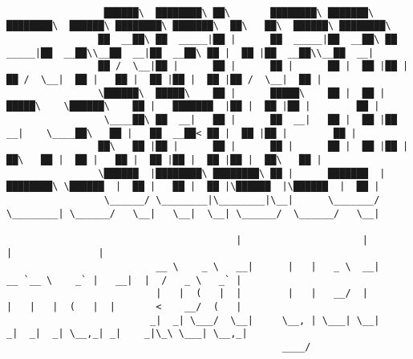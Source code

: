 \documentclass[varwidth=\maxdimen,margin=0.5cm,multi={verbatim}]{standalone}
\begin{document}
\begin{verbatim}

                 ██████\  ████████\ ██\       ████████\ ███████\  ████████\  ██████\ ████████\ ███████\  ██\   ██\  ██████\ ████████\ 
                ██  __██\ ██  _____|██ |      ██  _____|██  __██\ ██  _____|██  __██\\__██  __|██  __██\ ██ |  ██ |██  __██\\__██  __|
                ██ /  \__|██ |      ██ |      ██ |      ██ |  ██ |██ |      ██ /  \__|  ██ |   ██ |  ██ |██ |  ██ |██ /  \__|  ██ |   
                \██████\  █████\    ██ |      █████\    ██ |  ██ |█████\    \██████\    ██ |   ███████  |██ |  ██ |██ |        ██ |   
                 \____██\ ██  __|   ██ |      ██  __|   ██ |  ██ |██  __|    \____██\   ██ |   ██  __██< ██ |  ██ |██ |        ██ |   
                ██\   ██ |██ |      ██ |      ██ |      ██ |  ██ |██ |      ██\   ██ |  ██ |   ██ |  ██ |██ |  ██ |██ |  ██\   ██ |   
                \██████  |████████\ ████████\ ██ |      ███████  |████████\ \██████  |  ██ |   ██ |  ██ |\██████  |\██████  |  ██ |   
                 \______/ \________|\________|\__|      \_______/ \________| \______/   \__|   \__|  \__| \______/  \______/   \__|

                                        |                     |                                |               | 
                          __ \    _ \   __|      |   |   _ \  __|      __ `__ \    _` |   __|  |  /   _ \   _` | 
                          |   |  (   |  |        |   |   __/  |        |   |   |  (   |  |       <    __/  (   | 
                         _|  _| \___/  \__|     \__, | \___| \__|     _|  _|  _| \__,_| _|    _|\_\ \___| \__,_| 
                                                ____/



\end{verbatim}
\end{document}
